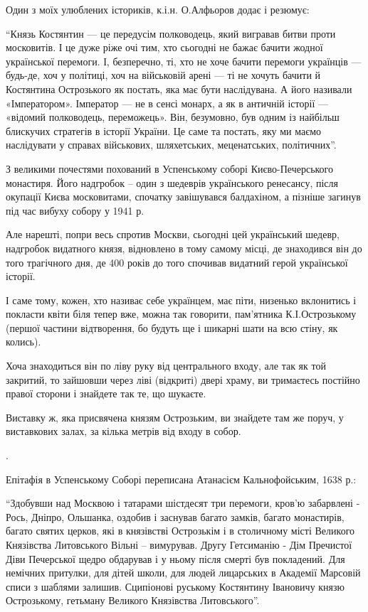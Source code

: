 Один з моїх улюблених істориків, к.і.н. О.Алфьоров додає і резюмує:

\enquote{Князь Костянтин — це передусім полководець, який вигравав битви проти
московитів. І це дуже ріже очі тим, хто сьогодні не бажає бачити жодної
української перемоги. І, безперечно, ті, хто не хоче бачити перемоги українців
— будь-де, хоч у політиці, хоч на військовій арені — ті не хочуть бачити й
Костянтина Острозького як постать, яка має бути наслідувана. А його називали
«Імператором». Імператор — не в сенсі монарх, а як в античній історії —
«відомий полководець, переможець». Він, безумовно, був одним із найбільш
блискучих стратегів в історії України. Це саме та постать, яку ми маємо
наслідувати у справах військових, шляхетських, меценатських, політичних}.

З великими почестями похований в Успенському соборі Києво-Печерського
монастиря. Його надгробок – один з шедеврів українського ренесансу, після
окупації Києва московитами, спочатку завішувався балдахіном, а пізніше загинув
під час вибуху собору у 1941 р. 

Але нарешті, попри весь спротив Москви, сьогодні цей український шедевр,
надгробок видатного князя, відновлено в тому самому місці, де знаходився він до
того трагічного дня, де 400 років до того спочивав видатний герой української
історії.

І саме тому, кожен, хто називає себе українцем, має піти, низенько вклонитись і
покласти квіти біля тепер вже, можна так говорити, пам’ятника К.І.Острозькому
(першої частини відтворення, бо будуть ще і шикарні шати на всю стіну, як
колись).

Хоча знаходиться він по ліву руку від центрального входу, але так як той
закритий, то зайшовши через ліві (відкриті) двері храму, ви тримаєтесь постійно
правої сторони і знайдете так те, що шукаєте. 

Виставку ж, яка присвячена князям Острозьким, ви знайдете там же поруч, у
виставкових залах, за кілька метрів від входу в собор.

.

Епітафія в Успенському Соборі переписана Атанасієм Кальнофойським, 1638 р.:

\enquote{Здобувши над Москвою і татарами шістдесят три перемоги, кров'ю забарвлені -
Рось, Дніпро, Ольшанка, оздобив і заснував багато замків, багато монастирів,
багато святих церков, які в князівстві Острозькім і в столичному місті
Великого Князівства Литовського Вільні – вимурував. Другу Гетсиманію - Дім
Пречистої Діви Печерської щедро обдарував і у ньому після смерті був
покладений. Для немічних притулки, для дітей школи, для людей лицарських в
Академії Марсовій списи з шаблями залишив. Сципіонові руському Костянтину
Івановичу князю Острозькому, гетьману Великого Князівства Литовського}.

